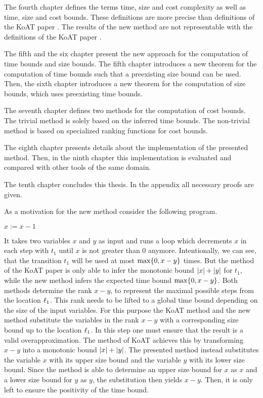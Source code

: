 The fourth chapter defines the terms time, size and cost complexity as well as time, size and cost bounds.
These definitions are more precise than definitions of the KoAT paper \cite{koat}.
The results of the new method are not representable with the definitions of the KoAT paper \cite{koat}.

The fifth and the six chapter present the new approach for the computation of time bounds and size bounds.
The fifth chapter introduces a new theorem for the computation of time bounds such that a preexisting size bound can be used.
Then, the sixth chapter introduces a new theorem for the computation of size bounds, which uses preexisting time bounds.

The seventh chapter defines two methods for the computation of cost bounds.
The trivial method is solely based on the inferred time bounds.
The non-trivial method is based on specialized ranking functions for cost bounds.

The eighth chapter presents details about the implementation of the presented method.
Then, in the ninth chapter this implementation is evaluated and compared with other tools of the same domain.

The tenth chapter concludes this thesis.
In the appendix all necessary proofs are given.

As a motivation for the new method consider the following program.

\begin{algorithmic}
    \State $x := x - 1$
  \EndWhile
\end{algorithmic}

It takes two variables $x$ and $y$ as input and runs a loop which decrements $x$ in each step with $t_1$ until $x$ is not greater than 0 anymore.
Intentionally, we can see, that the transition $t_1$ will be used at most $\max \lbrace 0, x-y \rbrace$ times.
But the method of the KoAT paper \cite{koat} is only able to infer the monotonic bound $\left|x\right|+\left|y\right|$ for $t_1$, while the new method infers the expected time bound $\max \lbrace 0, x-y \rbrace$.
Both methods determine the rank $x-y$, to represent the maximal possible steps from the location $\ell_1$.
This rank needs to be lifted to a global time bound depending on the size of the input variables.
For this purpose the KoAT method and the new method substitute the variables in the rank $x-y$ with a corresponding size bound up to the location $\ell_1$.
In this step one must ensure that the result is a valid overapproximation.
The method of KoAT achieves this by transforming $x-y$ into a monotonic bound $\left|x\right|+\left|y\right|$.
The presented method instead substitutes the variable $x$ with its upper size bound and the variable $y$ with its lower size bound.
Since the method is able to determine an upper size bound for $x$ as $x$ and a lower size bound for $y$ as $y$, the substitution then yields $x-y$.
Then, it is only left to ensure the positivity of the time bound.
